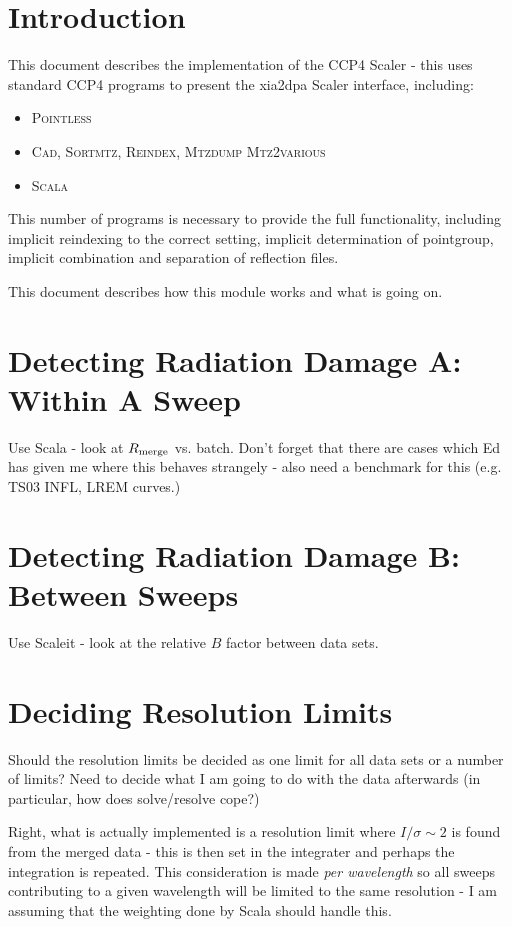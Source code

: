 \documentclass[a4paper, 11pt]{article}
\begin{document}
\section{Introduction}

This document describes the implementation of the CCP4 Scaler - this uses 
standard CCP4 programs to present the xia2dpa Scaler interface, including:

\begin{itemize}
\item{\textsc{Pointless}}
\item{\textsc{Cad}, \textsc{Sortmtz}, \textsc{Reindex}, \textsc{Mtzdump}
\textsc{Mtz2various}}
\item{\textsc{Scala}}
\end{itemize}

\noindent
This number of programs is necessary to provide the full functionality,
including implicit reindexing to the correct setting, implicit determination
of pointgroup, implicit combination and separation of reflection files.

This document describes how this module works and what is going on.

\section{Detecting Radiation Damage A: Within A Sweep}

Use Scala - look at $R_{\rm{merge}}$ vs. batch. Don't forget that there 
are cases which Ed has given me where this behaves strangely - also need
a benchmark for this (e.g. TS03 INFL, LREM curves.)

\section{Detecting Radiation Damage B: Between Sweeps}

Use Scaleit - look at the relative $B$ factor between data sets.

\section{Deciding Resolution Limits}

Should the resolution limits be decided as one limit for all data sets or
a number of limits? Need to decide what I am going to do with the data 
afterwards (in particular, how does solve/resolve cope?)

Right, what is actually implemented is a resolution limit where 
$I/\sigma \sim 2$ is found from the merged data - this is then set in the 
integrater and perhaps the integration is repeated. This consideration is
made \emph{per wavelength} so all sweeps contributing to a given wavelength
will be limited to the same resolution - I am assuming that the weighting
done by Scala should handle this.
\end{document}
